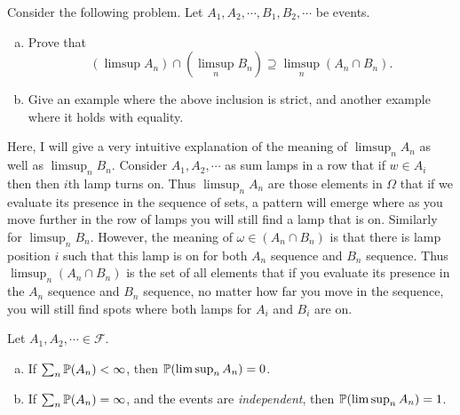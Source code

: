  
 \begin{observation}
 	Consider the following problem. Let $ A_1,A_2,\cdots, B_1,B_2,\cdots $ be events.
	\begin{enumerate}[(a)]
		\item Prove that 
		\[ (\limsup A_n) \cap (\limsup_n B_n) \supseteq \limsup_n (A_n\cap B_n). \]
		\item Give an example where the above inclusion is strict, and another example where it holds with equality.
	\end{enumerate}
 	Here, I will give a very intuitive explanation of the meaning of $ \limsup_n A_n $ as well as $ \limsup_n B_n $. Consider $ A_1,A_2,\cdots $ as sum lamps in a row that if $ w \in A_i $ then then $ i $th lamp turns on. Thus $ \limsup_n A_n $ are those elements in $ \Omega $ that if we evaluate its presence in the sequence of sets, a pattern will emerge where as you move further in the row of lamps you will still find a lamp that is on. Similarly for $ \limsup_n B_n $. However, the meaning of $ \omega \in (A_n\cap B_n) $ is that there is lamp position $ i $ such that this lamp is on for both $ A_n $ sequence and $ B_n $ sequence. Thus $ \limsup_n (A_n\cap B_n) $ is the set of all elements that if you evaluate its presence in the $ A_n $ sequence and $ B_n $ sequence, no matter how far you move in the sequence, you will still find spots where both lamps for $ A_i $ and $ B_i $ are on.
 \end{observation}
 
 \begin{proposition}
 	Let $ A_1,A_2,\cdots \in \mathcal{F} $.
 	\begin{enumerate}[(a)]
 		\item If $ \sum_n \mathbb{P}(A_n) < \infty $, then $ \mathbb{P}(\limsup_n A_n) = 0 $.
 		\item If $ \sum_n \mathbb{P}(A_n) = \infty $, and the events are \emph{independent}, then $ \mathbb{P}(\limsup_n A_n) = 1 $.
 	\end{enumerate}
 \end{proposition}
 
